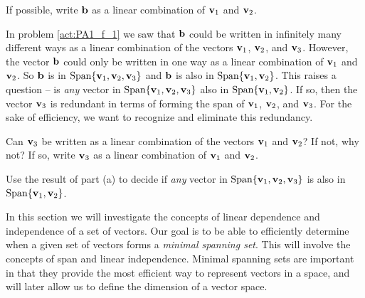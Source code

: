 \begin{pa}
	\item If possible, write $\mathbf{b}$ as a linear combination of $\mathbf{v}_1$ and $\mathbf{v}_2$.  


	\ea


\item In problem \ref{act:PA1_f_1} we saw that $\mathbf{b}$ could be written in infinitely many different ways as a linear combination of the vectors $\mathbf{v}_1$, $\mathbf{v}_2$, and $\mathbf{v}_3$. However, the vector $\mathbf{b}$ could only be written in one way as a linear combination of $\mathbf{v}_1$ and $\mathbf{v}_2$. So $\mathbf{b}$ is in $\text{Span} \{\mathbf{v}_1, \mathbf{v}_2, \mathbf{v}_3\}$ and $\mathbf{b}$ is also in $\text{Span} \{\mathbf{v}_1, \mathbf{v}_2\} $. This raises a question -- is \emph{any} vector in $\text{Span} \{\mathbf{v}_1, \mathbf{v}_2, \mathbf{v}_3\}$ also in $\text{Span}\{\mathbf{v}_1, \mathbf{v}_2\}$. If so, then the vector $\mathbf{v}_3$ is redundant in terms of forming the span of $\mathbf{v}_1$, $\mathbf{v}_2$, and $\mathbf{v}_3$. For the sake of efficiency, we want to recognize and eliminate this redundancy.  
 
	\ba
	\item Can $\mathbf{v}_3$ be written as a linear combination of the vectors $\mathbf{v}_1$ and $\mathbf{v}_2$? If not, why not? If so, write $\mathbf{v}_3$ as a linear combination of $\mathbf{v}_1$ and $\mathbf{v}_2$. 
	
	
	\item Use the result of part (a) to decide if \emph{any} vector in $\text{Span}\{\mathbf{v}_1, \mathbf{v}_2, \mathbf{v}_3\}$ is also in $\text{Span}\{\mathbf{v}_1, \mathbf{v}_2\}$. 


\ea

\ee

\end{pa}

\label{sec:lin_indep}

In this section we will investigate the concepts of linear dependence and independence of a set of vectors. Our goal is to be able to efficiently determine when a given set of vectors forms a \emph{minimal spanning set}. This will involve the concepts of span and linear independence. Minimal spanning sets are important in that they provide the most efficient way to represent vectors in a space, and will later allow us to define the dimension of a vector space.  


